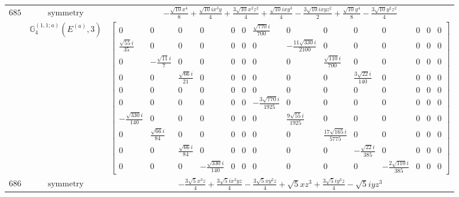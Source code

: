 \documentclass[fleqn,8pt,landscape]{jsarticle}
\begin{document}
\begin{longtable}{ccc}
$ 685 $ & $ \text{symmetry} $ & $ - \frac{\sqrt{10} x^{4}}{8} + \frac{\sqrt{10} i x^{3} y}{4} + \frac{3 \sqrt{10} x^{2} z^{2}}{4} + \frac{\sqrt{10} i x y^{3}}{4} - \frac{3 \sqrt{10} i x y z^{2}}{2} + \frac{\sqrt{10} y^{4}}{8} - \frac{3 \sqrt{10} y^{2} z^{2}}{4} $ \\
$  $ & $ \mathbb{G}_{4}^{(1,1;a)}(E^{(a)},3) $ & $ \begin{bmatrix} 0 & 0 & 0 & 0 & 0 & 0 & \frac{\sqrt{770} i}{700} & 0 & 0 & 0 & 0 & 0 & 0 & 0 \\ \frac{\sqrt{55} i}{35} & 0 & 0 & 0 & 0 & 0 & 0 & - \frac{11 \sqrt{330} i}{2100} & 0 & 0 & 0 & 0 & 0 & 0 \\ 0 & - \frac{\sqrt{11} i}{7} & 0 & 0 & 0 & 0 & 0 & 0 & \frac{\sqrt{110} i}{700} & 0 & 0 & 0 & 0 & 0 \\ 0 & 0 & \frac{\sqrt{66} i}{21} & 0 & 0 & 0 & 0 & 0 & 0 & \frac{3 \sqrt{22} i}{140} & 0 & 0 & 0 & 0 \\ 0 & 0 & 0 & 0 & 0 & 0 & 0 & 0 & 0 & 0 & 0 & 0 & 0 & 0 \\ 0 & 0 & 0 & 0 & 0 & 0 & - \frac{3 \sqrt{770} i}{1925} & 0 & 0 & 0 & 0 & 0 & 0 & 0 \\ - \frac{\sqrt{330} i}{140} & 0 & 0 & 0 & 0 & 0 & 0 & \frac{9 \sqrt{55} i}{1925} & 0 & 0 & 0 & 0 & 0 & 0 \\ 0 & \frac{\sqrt{66} i}{84} & 0 & 0 & 0 & 0 & 0 & 0 & \frac{17 \sqrt{165} i}{5775} & 0 & 0 & 0 & 0 & 0 \\ 0 & 0 & \frac{\sqrt{66} i}{84} & 0 & 0 & 0 & 0 & 0 & 0 & - \frac{\sqrt{22} i}{385} & 0 & 0 & 0 & 0 \\ 0 & 0 & 0 & - \frac{\sqrt{330} i}{140} & 0 & 0 & 0 & 0 & 0 & 0 & - \frac{2 \sqrt{110} i}{385} & 0 & 0 & 0 \end{bmatrix} $ \\ \hline
$ 686 $ & $ \text{symmetry} $ & $ - \frac{3 \sqrt{5} x^{3} z}{4} + \frac{3 \sqrt{5} i x^{2} y z}{4} - \frac{3 \sqrt{5} x y^{2} z}{4} + \sqrt{5} x z^{3} + \frac{3 \sqrt{5} i y^{3} z}{4} - \sqrt{5} i y z^{3} $ \\

\end{longtable}
\end{document}
